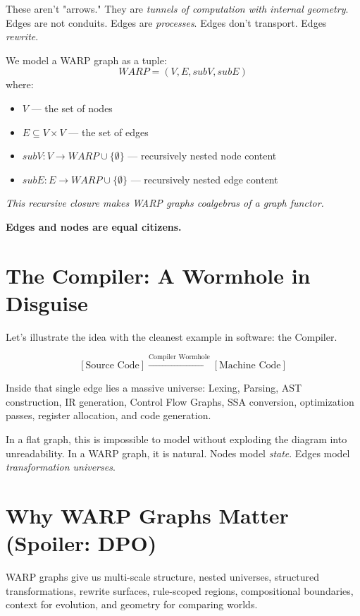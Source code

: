 These aren't "arrows." They are \textit{tunnels of computation with internal geometry}. Edges are not conduits. Edges are \textit{processes}. Edges don't transport. Edges \textit{rewrite}.

\begin{tcolorbox}[colback=gray!10, colframe=black, title=\textbf{📦 FOR THE NERDS™: Formal Shape of a WARP graph}]
We model a WARP graph as a tuple:
\[ WARP = (V, E, subV, subE) \]
where:
\begin{itemize}
    \item $V$ — the set of nodes
    \item $E \subseteq V \times V$ — the set of edges
    \item $subV: V \rightarrow WARP \cup \{\emptyset\}$ — recursively nested node content
    \item $subE: E \rightarrow WARP \cup \{\emptyset\}$ — recursively nested edge content
\end{itemize}

\textit{This recursive closure makes WARP graphs coalgebras of a graph functor.}

\textbf{Edges and nodes are equal citizens.}
\end{tcolorbox}

\section{The Compiler: A Wormhole in Disguise}
\label{sec:compiler-wormhole}

Let's illustrate the idea with the cleanest example in software: the Compiler.

\[ [\text{Source Code}] \xrightarrow{\text{Compiler Wormhole}} [\text{Machine Code}] \]

Inside that single edge lies a massive universe: Lexing, Parsing, AST construction, IR generation, Control Flow Graphs, SSA conversion, optimization passes, register allocation, and code generation.

In a flat graph, this is impossible to model without exploding the diagram into unreadability. In a WARP graph, it is natural. Nodes model \textit{state}. Edges model \textit{transformation universes}.

\section{Why WARP Graphs Matter (Spoiler: DPO)}
\label{sec:rmg-matter}

WARP graphs give us multi-scale structure, nested universes, structured transformations, rewrite surfaces, rule-scoped regions, compositional boundaries, context for evolution, and geometry for comparing worlds.

